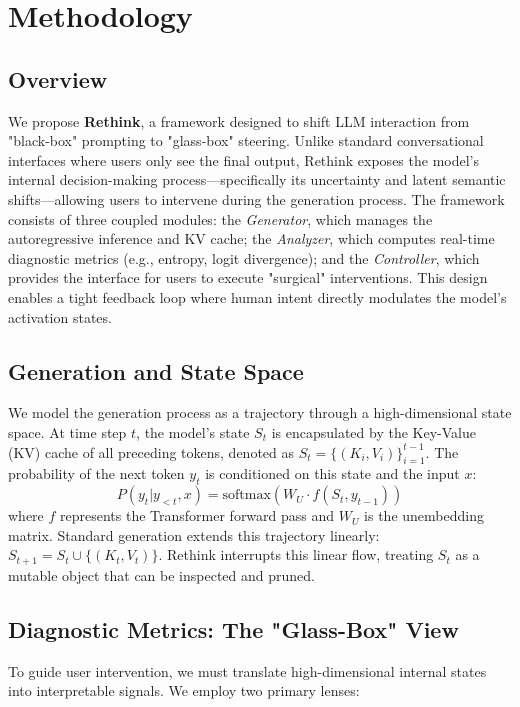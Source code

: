\documentclass{article}
\begin{document}
\section{Methodology}

\subsection{Overview}
We propose \textbf{Rethink}, a framework designed to shift LLM interaction from "black-box" prompting to "glass-box" steering. Unlike standard conversational interfaces where users only see the final output, Rethink exposes the model's internal decision-making process—specifically its uncertainty and latent semantic shifts—allowing users to intervene during the generation process.
The framework consists of three coupled modules: the \textit{Generator}, which manages the autoregressive inference and KV cache; the \textit{Analyzer}, which computes real-time diagnostic metrics (e.g., entropy, logit divergence); and the \textit{Controller}, which provides the interface for users to execute "surgical" interventions. This design enables a tight feedback loop where human intent directly modulates the model's activation states.

\subsection{Generation and State Space}
We model the generation process as a trajectory through a high-dimensional state space. At time step $t$, the model's state $S_t$ is encapsulated by the Key-Value (KV) cache of all preceding tokens, denoted as $S_t = \{(K_i, V_i)\}_{i=1}^{t-1}$. The probability of the next token $y_t$ is conditioned on this state and the input $x$:
\begin{equation}
 P(y_t | y_{<t}, x) = \text{softmax}(W_U \cdot f(S_t, y_{t-1}))
\end{equation}
where $f$ represents the Transformer forward pass and $W_U$ is the unembedding matrix. Standard generation extends this trajectory linearly: $S_{t+1} = S_t \cup \{(K_t, V_t)\}$. Rethink interrupts this linear flow, treating $S_t$ as a mutable object that can be inspected and pruned.

\subsection{Diagnostic Metrics: The "Glass-Box" View}
To guide user intervention, we must translate high-dimensional internal states into interpretable signals. We employ two primary lenses:
\end{document}

